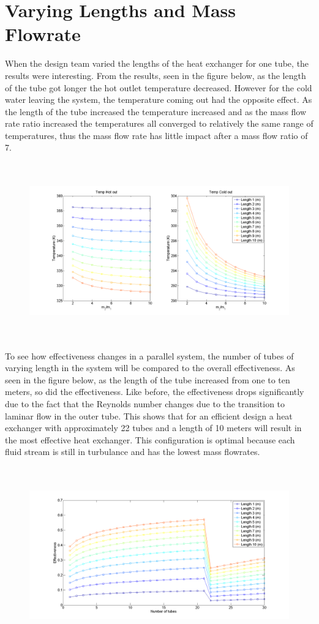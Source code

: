 \section{Varying Lengths and Mass Flowrate}
%
When the design team varied the lengths of the heat exchanger for one tube, the results were interesting. From the results, seen in the figure below, as the length of the tube got longer the hot outlet temperature decreased. However for the cold water leaving the system, the temperature coming out had the opposite effect. As the length of the tube increased the temperature increased and as the mass flow rate ratio increased the temperatures all converged to relatively the same range of temperatures, thus the mass flow rate has little impact after a mass flow ratio of 7. 
%
\begin{figure}[H]
    \centering
    \includegraphics[height=3in]{pictures/part_3_single_temp_len_mass.png}
\end{figure}
%
\noindent
To see how effectiveness changes in a parallel system, the number of tubes of varying length in the system will be compared to the overall effectiveness. As seen in the figure below, as the length of the tube increased from one to ten meters, so did the effectiveness. Like before, the effectiveness drops significantly due to the fact that the Reynolds number changes due to the transition to laminar flow in the outer tube. This shows that for an efficient design a heat exchanger with approximately 22 tubes and a length of 10 meters will result in the most effective heat exchanger. This configuration is optimal because each fluid stream is still in turbulance and has the lowest mass flowrates.
%
\begin{figure}[H]
    \centering
    \includegraphics[height=3in]{pictures/part_3_eff_tubes_length.png}
\end{figure}
%




